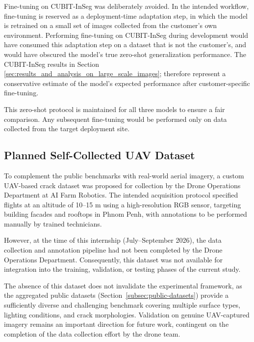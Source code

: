 \hs Fine-tuning on CUBIT-InSeg was deliberately avoided. In the intended workflow, fine-tuning is reserved as a deployment-time adaptation step, in which the model is retrained on a small set of images collected from the customer's own environment. Performing fine-tuning on CUBIT-InSeg during development would have consumed this adaptation step on a dataset that is not the customer's, and would have obscured the model's true zero-shot generalization performance. The CUBIT-InSeg results in Section \ref{sec:results_and_analysis_on_large_scale_images}; therefore represent a conservative estimate of the model's expected performance after customer-specific fine-tuning.

\hs This zero-shot protocol is maintained for all three models to ensure a fair comparison. Any subsequent fine-tuning would be performed only on data collected from the target deployment site.


\newpage

\subsection{Planned Self-Collected UAV Dataset}
\hs To complement the public benchmarks with real-world aerial imagery, a custom UAV-based crack dataset was proposed for collection by the Drone Operations Department at AI Farm Robotics. The intended acquisition protocol specified flights at an altitude of 10–15 m using a high-resolution RGB sensor, targeting building facades and rooftops in Phnom Penh, with annotations to be performed manually by trained technicians.

\hs However, at the time of this internship (July–September 2026), the data collection and annotation pipeline had not been completed by the Drone Operations Department. Consequently, this dataset was not available for integration into the training, validation, or testing phases of the current study.

\hs The absence of this dataset does not invalidate the experimental framework, as the aggregated public datasets (Section~\ref{subsec:public-datasets}) provide a sufficiently diverse and challenging benchmark covering multiple surface types, lighting conditions, and crack morphologies. Validation on genuine UAV-captured imagery remains an important direction for future work, contingent on the completion of the data collection effort by the drone team.

